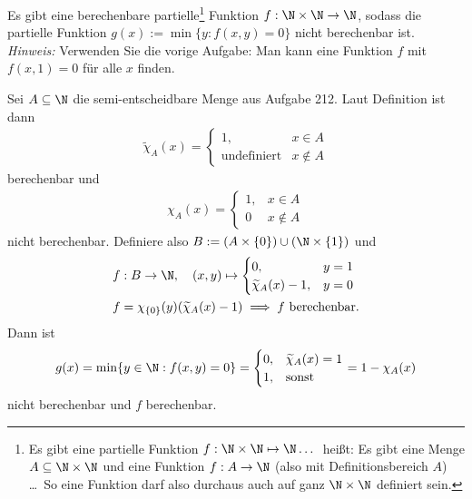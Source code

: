 
\begin{exercise}[213]

Es gibt eine berechenbare partielle\footnote{\glqq Es gibt eine partielle Funktion
$f: \N \times \N \mapsto \N \dots$\grqq\ heißt:
\glqq Es gibt eine Menge $A \subseteq \N \times \N$ und eine Funktion $f: A \to \N$
(also mit Definitionsbereich $A$) \dots\grqq\ So eine Funktion darf also durchaus
auch auf ganz $\N \times \N$ definiert sein.}
Funktion $f: \N \times \N \to \N$, sodass die partielle Funktion
$g(x) := \min\{y: f(x,y) = 0\}$ nicht berechenbar ist. \\
\textit{Hinweis:} Verwenden Sie die vorige Aufgabe: Man kann eine Funktion
$f$ mit $f(x,1) = 0$ für alle $x$ finden.

\end{exercise}


\begin{solution}

Sei $A \subseteq \N$ die semi-entscheidbare Menge aus Aufgabe 212.
Laut Definition ist dann
\begin{align*}
  \widetilde{\chi}_A(x) = \begin{cases}
    1, & x \in A \\
    \text{undefiniert} & x \notin A
  \end{cases}
\end{align*}
berechenbar und
\begin{align*}
  \chi_A(x) = \begin{cases}
    1, & x \in A \\
    0 & x \notin A
  \end{cases}
\end{align*}
nicht berechenbar. Definiere also $B := (A \times \{0\}) \cup (\N \times \{1\})$
und
\begin{align*}
  f&: B \to \N, \quad (x,y) \mapsto \begin{cases}
      0, & y = 1 \\
      \widetilde{\chi}_A(x) - 1, & y = 0
  \end{cases} \\
  f &= \chi_{\{0\}}(y)(\widetilde{\chi}_A(x) - 1) \implies f \text{ berechenbar}.
\end{align*}
Dann ist
\begin{align*}
  g(x) = \min\{y \in \N: f(x,y) = 0\} =
  \begin{cases}
      0, & \widetilde{\chi}_A(x) = 1 \\
      1, & \text{sonst}
  \end{cases}
  = 1 - \chi_A(x)
\end{align*}
nicht berechenbar und $f$ berechenbar.
\end{solution}
